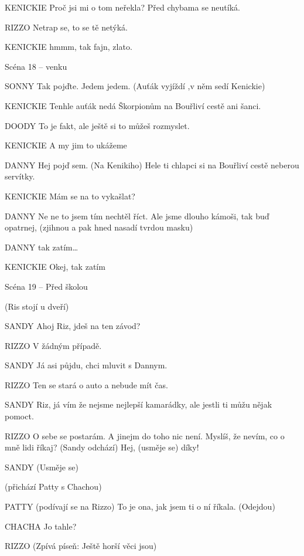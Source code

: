 KENICKIE        Proč jsi mi o tom neřekla? Před chybama se neutíká.

RIZZO        Netrap se, to se tě netýká. 

KENICKIE        hmmm, tak fajn, zlato. 





Scéna 18  – venku

SONNY        Tak pojďte. Jedem jedem. (Auťák vyjíždí ,v něm sedí Kenickie)

KENICKIE        Tenhle auťák nedá Škorpionům na Bouřliví cestě ani šanci.

DOODY        To je fakt, ale ještě si to můžeš rozmyslet.  

KENICKIE        A my jim to ukážeme

DANNY        Hej pojď sem. (Na Kenikiho) Hele ti chlapci si na Bouřliví cestě neberou         servítky.

KENICKIE        Mám se na to vykašlat?

DANNY        Ne ne to jsem tím nechtěl říct. Ale jsme dlouho kámoši, tak buď opatrnej, (zjihnou a pak hned nasadí tvrdou masku)

DANNY        tak zatím…

KENICKIE        Okej, tak zatím 





Scéna 19 – Před školou 

(Ris stojí u dveří)

SANDY        Ahoj Riz, jdeš na ten závod?

RIZZO        V žádným případě.

SANDY        Já asi půjdu, chci mluvit s Dannym.

RIZZO        Ten se stará o auto a nebude mít čas. 

SANDY        Riz, já vím že nejsme nejlepší kamarádky, ale jestli ti můžu nějak                 pomoct.

RIZZO        O sebe se postarám. A jinejm do toho nic není. Myslíš, že nevím, co o         mně lidi říkaj? (Sandy odchází) Hej, (usměje se) díky! 

SANDY        (Usměje se) 

(přichází Patty s Chachou) 

PATTY        (podívají se na Rizzo) To je ona, jak jsem ti o ní říkala. (Odejdou)

CHACHA            Jo tahle?

RIZZO        (Zpívá píseň: Ještě horší věci jsou) 

